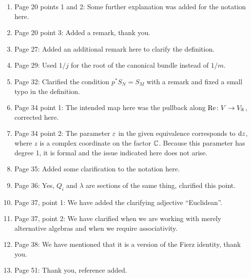 \documentclass[10pt, oneside]{article}
\begin{document}
\begin{enumerate}
 \item Page 20 points 1 and 2: Some further explanation was added for the notation here. 
 \item Page 20 point 3: Added a remark, thank you.
 \item Page 27: Added an additional remark here to clarify the definition.
  
 \item Page 29: Used $1/j$ for the root of the canonical bundle instead of $1/m$.
 \item Page 32: Clarified the condition $p^*S_N = S_M$ with a remark and fixed a small typo in the definition.
 \item Page 34 point 1: The intended map here was the pullback along $\mathrm{Re} \colon V \to V_\mathbb R$, corrected here.
 \item Page 34 point 2: The parameter $\varepsilon$ in the given equivalence corresponds to ${\rm d} z$, where $z$ is a complex coordinate on the factor $\mathbb C$.  Because this parameter has degree 1, it is formal and the issue indicated here does not arise.
 \item Page 35: Added some clarification to the notation here.
 \item Page 36: Yes, $Q_i$ and $\lambda$ are sections of the same thing, clarified this point. 
 \item Page 37, point 1: We have added the clarifying adjective ``Euclidean''.
 \item Page 37, point 2: We have clarified when we are working with merely alternative algebras and when we require associativity.
 \item Page 38: We have mentioned that it is a version of the Fierz identity, thank you.
 \item Page 51: Thank you, reference added.

\end{enumerate}
\end{document}
